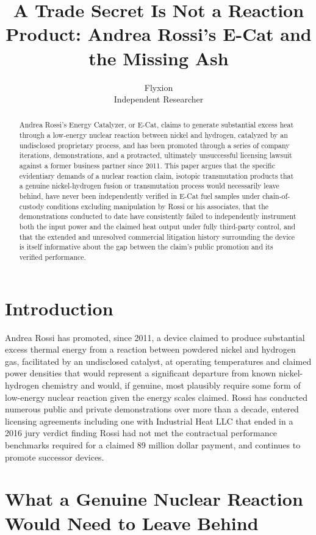\documentclass[11pt]{article}
\title{A Trade Secret Is Not a Reaction Product: Andrea Rossi's E-Cat and the Missing Ash}
\author{Flyxion \\ \small Independent Researcher}
\date{}
\begin{document}
\maketitle

\begin{abstract}
Andrea Rossi's Energy Catalyzer, or E-Cat, claims to generate substantial excess heat through a low-energy nuclear reaction between nickel and hydrogen, catalyzed by an undisclosed proprietary process, and has been promoted through a series of company iterations, demonstrations, and a protracted, ultimately unsuccessful licensing lawsuit against a former business partner since 2011. This paper argues that the specific evidentiary demands of a nuclear reaction claim, isotopic transmutation products that a genuine nickel-hydrogen fusion or transmutation process would necessarily leave behind, have never been independently verified in E-Cat fuel samples under chain-of-custody conditions excluding manipulation by Rossi or his associates, that the demonstrations conducted to date have consistently failed to independently instrument both the input power and the claimed heat output under fully third-party control, and that the extended and unresolved commercial litigation history surrounding the device is itself informative about the gap between the claim's public promotion and its verified performance.
\end{abstract}

\section{Introduction}

Andrea Rossi has promoted, since 2011, a device claimed to produce substantial excess thermal energy from a reaction between powdered nickel and hydrogen gas, facilitated by an undisclosed catalyst, at operating temperatures and claimed power densities that would represent a significant departure from known nickel-hydrogen chemistry and would, if genuine, most plausibly require some form of low-energy nuclear reaction given the energy scales claimed. Rossi has conducted numerous public and private demonstrations over more than a decade, entered licensing agreements including one with Industrial Heat LLC that ended in a 2016 jury verdict finding Rossi had not met the contractual performance benchmarks required for a claimed 89 million dollar payment, and continues to promote successor devices.

\section{What a Genuine Nuclear Reaction Would Need to Leave Behind}
\end{document}
